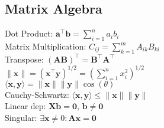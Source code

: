 \subsection*{Matrix Algebra}
Dot Product: $\mathbf{a}^{\top}\mathbf{b} = \sum_{i=1}^{n}a_{i}b_i$\\
Matrix Multiplication: $C_{ij} = \sum_{k=1}^{m} A_{ik}B_{ki}$\\
Transpose: $(\mathbf{A}\mathbf{B})^{\top} = \mathbf{B}^{\top} \mathbf{A}^{\top}$\\
$\lVert \mathbf{x} \rVert = (\mathbf{x}^{\top}\mathbf{y})^{1/2} = \left( \sum_{i=1}^{n} x_i ^2 \right)^{1/2}$\\
$\langle \mathbf{x}, \mathbf{y} \rangle = \lVert \mathbf{x} \rVert \lVert \mathbf{y} \rVert \cos(\theta)$\\
Cauchy-Schwartz: $\langle \mathbf{x}, \mathbf{y} \rangle \leq \lVert \mathbf{x} \rVert \lVert \mathbf{y} \rVert$\\
Linear dep: $\mathbf{X}\mathbf{b} = \mathbf{0}$, $\mathbf{b} \neq \mathbf{0}$\\
Singular: $\exists \mathbf{x} \neq 0 : \mathbf{Ax = 0}$\\